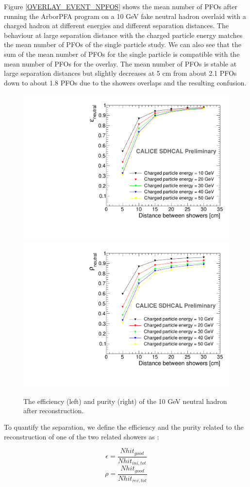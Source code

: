 \documentclass[12pt]{article}
\begin{document}
Figure \ref{OVERLAY_EVENT_NPFOS} shows the mean number of PFOs after running the ArborPFA program on a 10 GeV fake neutral hadron overlaid with a charged hadron at different energies and different separation distances. The behaviour at large separation distance with the charged particle energy matches the mean number of PFOs of the single particle study. We can also see that the sum of the mean number of PFOs for the single particle is compatible with the mean number of PFOs for the overlay. The mean number of PFOs is stable at large separation distances but slightly decreases at 5 cm from about 2.1 PFOs down to about 1.8 PFOs due to the showers overlaps and the resulting confusion.

\begin{figure}[!h]
  \begin{center}
    \includegraphics[width=0.47\linewidth]{plots/OverlayEvent_NeutralEfficiency.pdf}
    \includegraphics[width=0.47\linewidth]{plots/OverlayEvent_NeutralPurity.pdf}
  \end{center}
  \caption{\label{OVERLAY_EVENT_PURITY_EFFICIENCY} The efficiency (left) and purity (right) of the 10 GeV neutral hadron after reconstruction.}
\end{figure}


To quantify the separation, we define the efficiency and the purity related to the reconstruction of one of the two related showers as :

\begin{equation}
  \epsilon = \frac{Nhit_{good}}{Nhit_{ini,tot}}
\end{equation}
\begin{equation}
  \rho = \frac{Nhit_{good}}{Nhit_{rec,tot}}
\end{equation}
\end{document}
